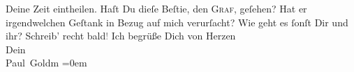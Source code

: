 \begin{ledgroupsized}[t]{13cm}
               Deine {\pb}Zeit eintheilen.\pend
           \pstart
           Haſt Du dieſe Beſtie, den \textsc{Graf}, geſehen? Hat er irgendwelchen Geſtank in Bezug auf mich verurſacht?\pend
           \pstart
           Wie geht es ſonſt Dir und ihr?\pend
           \pstart
           Schreib’ recht bald\textcolor{gray}{!}\pend
           \pstart
           Ich begrüße Dich von Herzen {\\[\baselineskip]}Dein {\\[\baselineskip]}\spacefill\mbox{Paul Goldm}\pend
           \leftskip=0em{}
         
         \endnumbering{}\end{ledgroupsized}  \newcommand{\dateiname}{L02815}\newcommand{\titel}{Paul Goldmann an Arthur Schnitzler, 18. 6. [1897]}\newcommand{\editorInnen}{Martin Anton Müller und Laura Untner}
      